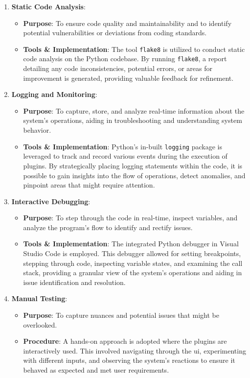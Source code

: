 \documentclass[
  a4paper,  %
  twoside,  %
  bibliography=totoc,
  headsepline,
  cleardoublepage=empty,
  parskip=half,
  draft=false
]{scrbook}
\begin{document}
\begin{enumerate}
    \item \textbf{Static Code Analysis}:
    \begin{itemize}
        \item \textbf{Purpose}: To ensure code quality and maintainability and to identify potential vulnerabilities or deviations from coding standards.
        \item \textbf{Tools \& Implementation}: The tool \texttt{flake8} is utilized to conduct static code analysis on the Python codebase.
        By running \texttt{flake8}, a report detailing any code inconsistencies, potential errors, or areas for improvement is generated, providing valuable feedback for refinement.
    \end{itemize}

    \item \textbf{Logging and Monitoring}:
    \begin{itemize}
        \item \textbf{Purpose}: To capture, store, and analyze real-time information about the system's operations, aiding in troubleshooting and understanding system behavior.
        \item \textbf{Tools \& Implementation}: Python's in-built \texttt{logging} package is leveraged to track and record various events during the execution of plugins.
        By strategically placing logging statements within the code, it is possible to gain insights into the flow of operations, detect anomalies, and pinpoint areas that might require attention.
    \end{itemize}

    \item \textbf{Interactive Debugging}:
    \begin{itemize}
        \item \textbf{Purpose}: To step through the code in real-time, inspect variables, and analyze the program's flow to identify and rectify issues.
        \item \textbf{Tools \& Implementation}: The integrated Python debugger in Visual Studio Code is employed.
        This debugger allowed for setting breakpoints, stepping through code, inspecting variable states, and examining the call stack, providing a granular view of the system's operations and aiding in issue identification and resolution.
    \end{itemize}

    \item \textbf{Manual Testing}:
    \begin{itemize}
        \item \textbf{Purpose}: To capture nuances and potential issues that might be overlooked.
        \item \textbf{Procedure}: A hands-on approach is adopted where the plugins are interactively used.
        This involved navigating through the \gls{ui}, experimenting with different inputs, and observing the system's reactions to ensure it behaved as expected and met user requirements.
    \end{itemize}
\end{enumerate}
\end{document}
